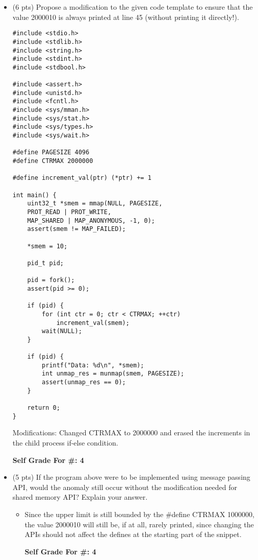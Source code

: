 \documentclass[conference]{IEEEtran}
\begin{document}
\begin{itemize}
	\item (6 pts) Propose a modification to the given code template to ensure that the value 2000010 is
	always printed at line 45 (without printing it directly!).
	\begin{lstlisting}
#include <stdio.h>
#include <stdlib.h>
#include <string.h>
#include <stdint.h>
#include <stdbool.h>

#include <assert.h>
#include <unistd.h>
#include <fcntl.h>
#include <sys/mman.h>
#include <sys/stat.h>
#include <sys/types.h>
#include <sys/wait.h>

#define PAGESIZE 4096
#define CTRMAX 2000000

#define increment_val(ptr) (*ptr) += 1

int main() {
	uint32_t *smem = mmap(NULL, PAGESIZE,
	PROT_READ | PROT_WRITE,
	MAP_SHARED | MAP_ANONYMOUS, -1, 0);
	assert(smem != MAP_FAILED);

	*smem = 10;
	
	pid_t pid;
	
	pid = fork();
	assert(pid >= 0);
	
	if (pid) {
		for (int ctr = 0; ctr < CTRMAX; ++ctr)
			increment_val(smem);
		wait(NULL);
	} 
	
	if (pid) {
		printf("Data: %d\n", *smem);
		int unmap_res = munmap(smem, PAGESIZE);
		assert(unmap_res == 0);
	}
	
	return 0;
}
	\end{lstlisting}
Modifications: Changed CTRMAX to 2000000 and erased the increments in the child process if-else condition.
		\begin{center}
			\textbf{Self Grade For \#: 4}
		\end{center}
\end{itemize}

\begin{itemize}
	\item (5 pts) If the program above were to be implemented using message passing API, would the
	anomaly still occur without the modification needed for shared memory API? Explain your
	answer.
	\begin{itemize} 
	\item Since the upper limit is still bounded by the \#define CTRMAX 1000000, the value 2000010 will still be, if at all, rarely printed, since changing the APIs should not affect the defines at the starting part of the snippet.
		\begin{center}
			\textbf{Self Grade For \#: 4}
		\end{center}
	\end{itemize}
\end{itemize}
\end{document}
